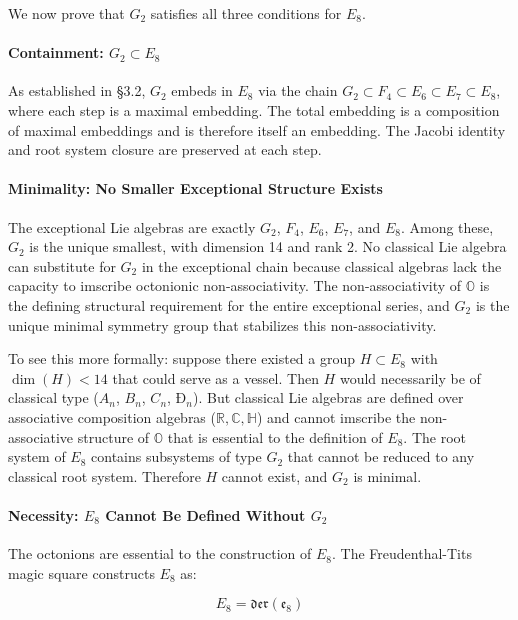\documentclass[12pt,a4paper]{article}
\newcommand{\pilcrow}{\S}
\begin{document}
We now prove that $G_2$ satisfies all three conditions for $E_8$.

\paragraph{Containment: $G_2 \subset E_8$}

As established in \pilcrow{}3.2, $G_2$ embeds in $E_8$ via the chain $G_2 \subset F_4 \subset E_6 \subset E_7 \subset E_8$, where each step is a maximal embedding. The total embedding is a composition of maximal embeddings and is therefore itself an embedding. The Jacobi identity and root system closure are preserved at each step.

\paragraph{Minimality: No Smaller Exceptional Structure Exists}

The exceptional Lie algebras are exactly $G_2$, $F_4$, $E_6$, $E_7$, and $E_8$. Among these, $G_2$ is the unique smallest, with dimension 14 and rank 2. No classical Lie algebra can substitute for $G_2$ in the exceptional chain because classical algebras lack the capacity to imscribe octonionic non-associativity. The non-associativity of $\mathbb{O}$ is the defining structural requirement for the entire exceptional series, and $G_2$ is the unique minimal symmetry group that stabilizes this non-associativity.

To see this more formally: suppose there existed a group $H \subset E_8$ with $\dim(H) < 14$ that could serve as a vessel. Then $H$ would necessarily be of classical type ($A_n$, $B_n$, $C_n$, $Ð_n$). But classical Lie algebras are defined over associative composition algebras ($\mathbb{R}, \mathbb{C}, \mathbb{H}$) and cannot imscribe the non-associative structure of $\mathbb{O}$ that is essential to the definition of $E_8$. The root system of $E_8$ contains subsystems of type $G_2$ that cannot be reduced to any classical root system. Therefore $H$ cannot exist, and $G_2$ is minimal.

\paragraph{Necessity: $E_8$ Cannot Be Defined Without $G_2$}

The octonions are essential to the construction of $E_8$. The Freudenthal-Tits magic square constructs $E_8$ as:

\[E_8 = \mathfrak{der}(\mathfrak{e}_8)\]
\end{document}
